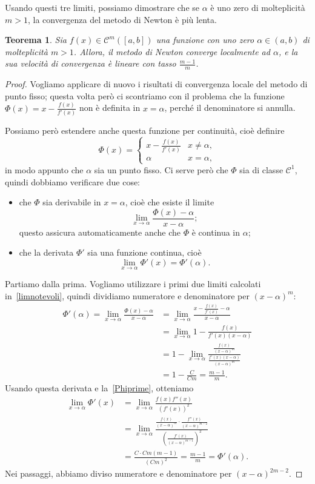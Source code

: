 \documentclass[a4paper]{report}
\newtheorem{theorem}{Teorema}[chapter]
\theoremstyle{definition}
\theoremstyle{remark}
\begin{document}
Usando questi tre limiti, possiamo dimostrare che se $\alpha$ è uno zero di molteplicità $m>1$, la convergenza del metodo di Newton è più lenta.
\begin{theorem}
    Sia $f(x) \in \mathcal{C}^m([a,b])$ una funzione con uno zero $\alpha \in (a,b)$ di molteplicità $m>1$.
    Allora, il metodo di Newton converge localmente ad $\alpha$, e la sua velocità di convergenza è lineare con tasso $\frac{m-1}{m}$.
\end{theorem}
\begin{proof}
Vogliamo applicare di nuovo i risultati di convergenza locale del metodo di punto fisso; questa volta però ci scontriamo con il problema che la funzione $\Phi(x) = x - \frac{f(x)}{f'(x)}$ non è definita in $x=\alpha$, perché il denominatore si annulla.

Possiamo però estendere anche questa funzione per continuità, cioè definire
\[
\Phi(x) = \begin{cases}
    x - \frac{f(x)}{f'(x)} & x\neq \alpha,\\
    \alpha & x=\alpha,
\end{cases}
\]
in modo appunto che $\alpha$ sia un punto fisso. Ci serve però che $\Phi$ sia di classe $\mathcal{C}^1$, quindi dobbiamo verificare due cose:
\begin{itemize}
    \item che $\Phi$ sia derivabile in $x=\alpha$, cioè che esiste il limite
    \[
        \lim_{x\to\alpha} \frac{\Phi(x)-\alpha}{x-\alpha};
    \]
    questo assicura automaticamente anche che $\Phi$ è continua in $\alpha$;
    \item che la derivata $\Phi'$ sia una funzione continua, cioè
    \[
        \lim_{x\to\alpha} \Phi'(x) = \Phi'(\alpha).
    \]
\end{itemize}
Partiamo dalla prima. Vogliamo utilizzare i primi due limiti calcolati in~\eqref{limnotevoli}, quindi dividiamo numeratore e denominatore per $(x-\alpha)^m$:
\begin{align*}
    \Phi'(\alpha) = \lim_{x\to\alpha} \frac{\Phi(x)-\alpha}{x-\alpha} &= \lim_{x\to\alpha} \frac{x - \frac{f(x)}{f'(x)}-\alpha}{x-\alpha}\\
    &= \lim_{x\to\alpha} 1 - \frac{f(x)}{f'(x)(x-\alpha)}\\
    &= 1 - \lim_{x\to\alpha}  \frac{\frac{f(x)}{(x-\alpha)^m}}{\frac{f'(x)(x-\alpha)}{(x-\alpha)^m}}\\
    & = 1 - \frac{C}{Cm} = \frac{m-1}{m}.
\end{align*}
Usando questa derivata e la~\eqref{Phiprime}, otteniamo 
\begin{align*}
    \lim_{x\to\alpha} \Phi'(x) &= \lim_{x\to\alpha} \frac{f(x)f''(x)}{(f'(x))^2}\\
    &= \lim_{x\to\alpha} \frac{\frac{f(x)}{(x-\alpha)^m}\cdot \frac{f''(x)}{(x-\alpha)^{m-2}}}{\left(\frac{f'(x)}{(x-\alpha)^{m-1}}\right)^2}\\
    &= \frac{C \cdot Cm(m-1)}{(Cm)^2} = \frac{m-1}{m} = \Phi'(\alpha).
\end{align*}
Nei passaggi, abbiamo diviso numeratore e denominatore per $(x-\alpha)^{2m-2}$.


\end{proof}
\end{document}
